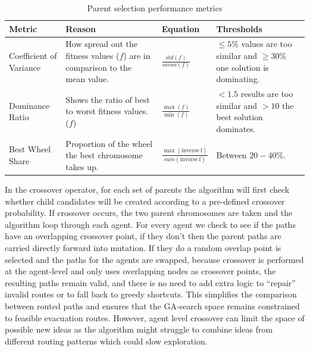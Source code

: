 \documentclass[12pt,a4paper]{report}
\begin{document}
\begin{table}[htb]
  \bigskip
  \begin{center}
    \begin{tabular}{| p{2.5cm} | p{5.2cm} | l | p{5cm} |}
      \hline
      Metric & Reason & Equation & Thresholds \\
      \hline
      \hline
      Coefficient of Variance & How spread out the fitness values ($f$) are in comparison to the mean value. & $\frac{std(f)}{mean(f)}$ & $\leq 5\%$ values are too similar and $\geq 30\%$ one solution is dominating. \\

      Dominance Ratio & Shows the ratio of best to worst fitness values. ($f$) & $\frac{\max(f)}{\min(f)}$ & $<1.5$ results are too similar and $>10$ the best solution dominates. \\

      Best Wheel Share & Proportion of the wheel the best chromosome takes up. & $\frac{\max(\mathrm{inverse\ f})}{sum(\mathrm{inverse\ f})}$ & Between $20-40\%$. \\

      \hline
    \end{tabular}
  \end{center}
\caption{Parent selection performance metrics}
\label{table:parent-selection}
\end{table}

In the crossover operator, for each set of parents the algorithm will first check whether child candidates will be created according to a pre-defined crossover probability. If crossover occurs, the two parent chromosomes are taken and the algorithm loop through each agent. For every agent we check to see if the paths have an overlapping crossover point, if they don’t then the parent paths are carried directly forward into mutation. If they do a random overlap point is selected and the paths for the agents are swapped, because crossover is performed at the agent‑level and only uses overlapping nodes as crossover points, the resulting paths remain valid, and there is no need to add extra logic to “repair” invalid routes or to fall back to greedy shortcuts. This simplifies the comparison between routed paths and ensures that the GA‑search space remains constrained to feasible evacuation routes. However, agent level crossover can limit the space of possible new ideas as the algorithm might struggle to combine ideas from different routing patterns which could slow exploration.
\end{document}

